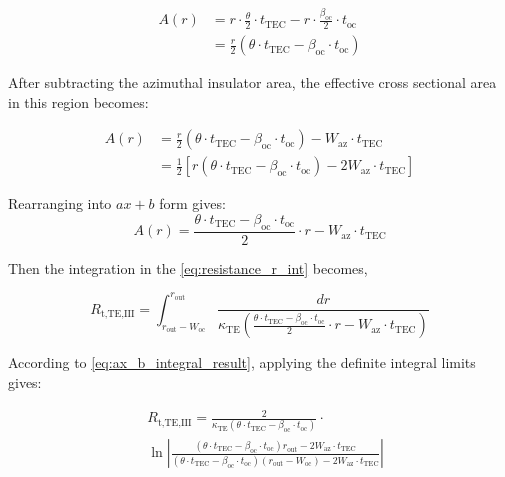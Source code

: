 \documentclass[10pt,a4paper,twocolumn]{article}
\begin{document}
\begin{equation*}
  \begin{aligned}
    A(r) & = r\cdot \frac{\theta}{2} \cdot t_{\text{TEC}} - r \cdot \frac{\beta_{\text{oc}}}{2} \cdot t_{\text{oc}} \\
         & = \frac{r}{2} (\theta \cdot t_{\text{TEC}} - \beta_{\text{oc}} \cdot t_{\text{oc}} )
  \end{aligned}
\end{equation*}

After subtracting the azimuthal insulator area, the effective cross sectional area in this region becomes:

\begin{equation*}
  \begin{aligned}
    A(r) & = \frac{r}{2} (\theta \cdot t_{\text{TEC}} - \beta_{\text{oc}} \cdot t_{\text{oc}} ) - W_{\text{az}} \cdot t_{\text{TEC}}                    \\
         & = \frac{1}{2} \left[ r (\theta \cdot t_{\text{TEC}} - \beta_{\text{oc}} \cdot t_{\text{oc}} ) - 2 W_{\text{az}} \cdot t_{\text{TEC}} \right]
  \end{aligned}
\end{equation*}

Rearranging into $ax+b$ form gives:
\begin{equation}
  A(r) = \frac{\theta \cdot t_{\text{TEC}}- \beta_{\text{oc}} \cdot t_{\text{oc}}}{2} \cdot r - W_{\text{az}} \cdot t_{\text{TEC}}
  \label{eq:area_TE_oc}
\end{equation}

Then the integration in the \cref{eq:resistance_r_int} becomes,

\begin{equation*}
  R_{\text{t,TE,III}} = \int_{r_{\text{out}}-W_{\text{oc}}}^{r_{\text{out}}} \frac{dr}{\kappa_{\text{TE}} \left( \frac{\theta \cdot t_{\text{TEC}}- \beta_{\text{oc}} \cdot t_{\text{oc}}}{2} \cdot r - W_{\text{az}} \cdot t_{\text{TEC}} \right)}
\end{equation*}

According to \cref{eq:ax_b_integral_result}, applying the definite integral limits gives:

\begin{equation}
  \begin{aligned}
  &R_{\text{t,TE,III}} = \frac{2}{\kappa_{\text{TE}} (\theta \cdot t_{\text{TEC}}- \beta_{\text{oc}} \cdot t_{\text{oc}})} \cdot \\ & \ln \left| \frac{(\theta \cdot t_{\text{TEC}}- \beta_{\text{oc}} \cdot t_{\text{oc}})r_{\text{out}} - 2 W_{\text{az}} \cdot t_{\text{TEC}}}{(\theta \cdot t_{\text{TEC}}- \beta_{\text{oc}} \cdot t_{\text{oc}})(r_{\text{out}}-W_{\text{oc}}) - 2 W_{\text{az}} \cdot t_{\text{TEC}}} \right|
  \end{aligned}
  \label{eq:R_TE_III}
\end{equation}
\end{document}

